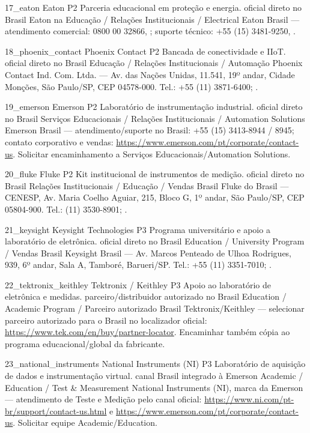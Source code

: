 \ContatoEmpresa
  {17_eaton}
  {Eaton}
  {P2}
  {Parceria educacional em proteção e energia.}
  {oficial direto no Brasil}
  {Eaton na Educação / Relações Institucionais / Electrical}
  {Eaton Brasil — atendimento comercial: 0800 00 32866, ; suporte técnico: +55 (15) 3481-9250, .}

\ContatoEmpresa
  {18_phoenix_contact}
  {Phoenix Contact}
  {P2}
  {Bancada de conectividade e IIoT.}
  {oficial direto no Brasil}
  {Educação / Relações Institucionais / Automação}
  {Phoenix Contact Ind. Com. Ltda. — Av. das Nações Unidas, 11.541, 19º andar, Cidade Monções, São Paulo/SP, CEP 04578-000. Tel.: +55 (11) 3871-6400; .}

\ContatoEmpresa
  {19_emerson}
  {Emerson}
  {P2}
  {Laboratório de instrumentação industrial.}
  {oficial direto no Brasil}
  {Serviços Educacionais / Relações Institucionais / Automation Solutions}
  {Emerson Brasil — atendimento/suporte no Brasil: +55 (15) 3413-8944 / 8945; contato corporativo e vendas: \url{https://www.emerson.com/pt/corporate/contact-us}. Solicitar encaminhamento a Serviços Educacionais/Automation Solutions.}

\ContatoEmpresa
  {20_fluke}
  {Fluke}
  {P2}
  {Kit institucional de instrumentos de medição.}
  {oficial direto no Brasil}
  {Relações Institucionais / Educação / Vendas Brasil}
  {Fluke do Brasil — CENESP, Av. Maria Coelho Aguiar, 215, Bloco G, 1º andar, São Paulo/SP, CEP 05804-900. Tel.: (11) 3530-8901; .}

\ContatoEmpresa
  {21_keysight}
  {Keysight Technologies}
  {P3}
  {Programa universitário e apoio a laboratório de eletrônica.}
  {oficial direto no Brasil}
  {Education / University Program / Vendas Brasil}
  {Keysight Brasil — Av. Marcos Penteado de Ulhoa Rodrigues, 939, 6º andar, Sala A, Tamboré, Barueri/SP. Tel.: +55 (11) 3351-7010; .}

\ContatoEmpresa
  {22_tektronix_keithley}
  {Tektronix / Keithley}
  {P3}
  {Apoio ao laboratório de eletrônica e medidas.}
  {parceiro/distribuidor autorizado no Brasil}
  {Education / Academic Program / Parceiro autorizado Brasil}
  {Tektronix/Keithley — selecionar parceiro autorizado para o Brasil no localizador oficial: \url{https://www.tek.com/en/buy/partner-locator}. Encaminhar também cópia ao programa educacional/global da fabricante.}

\ContatoEmpresa
  {23_national_instruments}
  {National Instruments (NI)}
  {P3}
  {Laboratório de aquisição de dados e instrumentação virtual.}
  {canal Brasil integrado à Emerson}
  {Academic / Education / Test \& Measurement}
  {National Instruments (NI), marca da Emerson — atendimento de Teste e Medição pelo canal oficial: \url{https://www.ni.com/pt-br/support/contact-us.html} e \url{https://www.emerson.com/pt/corporate/contact-us}. Solicitar equipe Academic/Education.}

